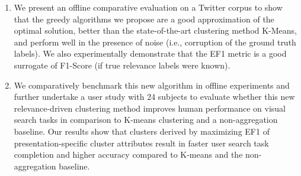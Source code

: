 \begin{enumerate}
\item We present an offline comparative evaluation on a Twitter corpus to show that the greedy algorithms we propose are a good approximation of the optimal solution, better than the state-of-the-art clustering method K-Means, and perform well in the presence of noise (i.e., corruption of the ground truth labels).
We also experimentally demonstrate that the EF1 metric is a good surrogate of F1-Score (if true relevance labels were known).
\item We comparatively benchmark this new algorithm in offline experiments and further undertake a user study with 24 subjects to evaluate whether this new relevance-driven clustering method improves human performance on visual search tasks in comparison to K-means clustering and a non-aggregation baseline.
Our results show that clusters derived by maximizing EF1 of presentation-specific cluster attributes result in faster user search task completion and higher accuracy compared to K-means and the non-aggregation baseline.
\end{enumerate}



